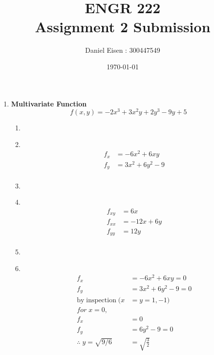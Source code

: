 \documentclass[11pt]{article}
\title{ENGR 222 \\ Assignment 2 Submission}
\author{Daniel Eisen : 300447549}
\date{\today}
\newcommand\Item[1][]{%
  \ifx\relax#1\relax  \item \else \item[#1] \fi
  \abovedisplayskip=0pt\abovedisplayshortskip=0pt~\vspace*{-\baselineskip}}
\begin{document}
\begin{preview}

\maketitle

\begin{enumerate}
    \item \textbf{Multivariate Function}
          $$f(x,y) = -2x^{3} + 3x^{2}y + 2y^{3} - 9y + 5$$
          \begin{enumerate}
              \Item
              \begin{align*}
                  f_{x} & = -6x^{2} + 6xy       \\
                  f_{y} & = 3x^{2} + 6y^{2} - 9 \\
              \end{align*}
              \Item
              \begin{align*}
                  f_{xy} & = 6x        \\
                  f_{xx} & = -12x + 6y \\
                  f_{yy} & = 12y       \\
              \end{align*}
              \Item
              \begin{align*}
                  f_x                              & = -6x^{2} + 6xy = 0                                  \\
                  f_y                              & = 3x^{2} + 6y^{2} - 9 = 0                            \\
                  \mathrm{by \; inspection \;}  (x & =y=1,-1)                                             \\
                  for \; x=0,                                                                             \\
                  f_x                              & = 0                                                  \\
                  f_y                              & = 6y^2 - 9 = 0                                       \\
                  \therefore \; y = \sqrt{9/6}     & = \sqrt{\frac{3}{2}}                                 \\

\end{align*}
\end{enumerate}
\end{enumerate}
\end{preview}
\end{document}
